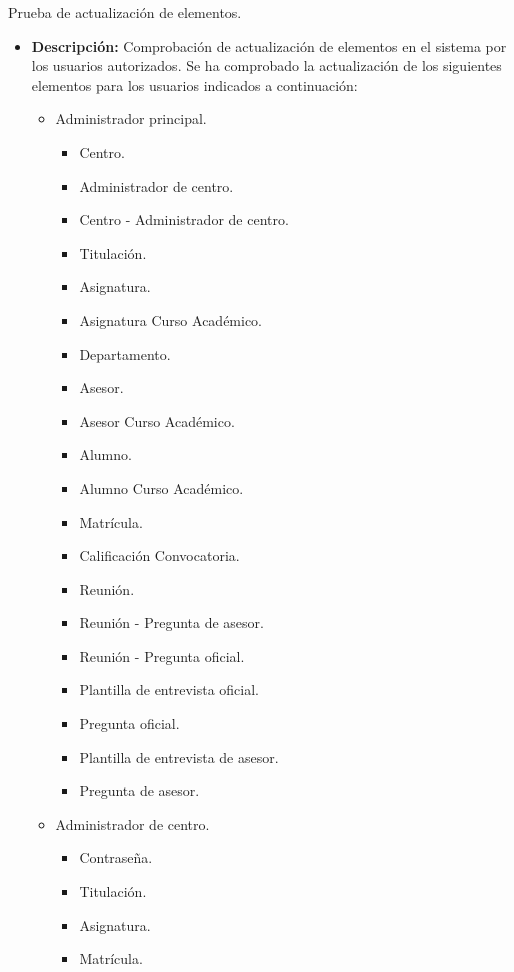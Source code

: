 \item Prueba de actualización de elementos.
  \begin{itemize}
    \item \textbf{Descripción:} Comprobación de actualización de elementos
    en el sistema por los usuarios autorizados. Se ha comprobado la
    actualización de los siguientes elementos para los usuarios indicados a
    continuación:

    \begin{itemize}
      \item Administrador principal.
      \begin{itemize}
        \item Centro.
        \item Administrador de centro.
        \item Centro - Administrador de centro.
        \item Titulación.
        \item Asignatura.
        \item Asignatura Curso Académico.
        \item Departamento.
        \item Asesor.
        \item Asesor Curso Académico.
        \item Alumno.
        \item Alumno Curso Académico.
        \item Matrícula.
        \item Calificación Convocatoria.
        \item Reunión.
        \item Reunión - Pregunta de asesor.
        \item Reunión - Pregunta oficial.
        \item Plantilla de entrevista oficial.
        \item Pregunta oficial.
        \item Plantilla de entrevista de asesor.
        \item Pregunta de asesor.
      \end{itemize}
      \item Administrador de centro.
      \begin{itemize}
        \item Contraseña.
        \item Titulación.
        \item Asignatura.
        \item Matrícula.

\end{itemize}
\end{itemize}
\end{itemize}
